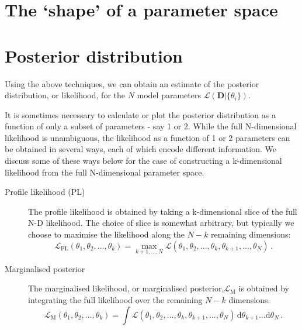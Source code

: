 
\section{The `shape' of a parameter space}



\section{Posterior distribution}

Using the above techniques, we can obtain an estimate of the posterior distribution, or likelihood, for the \(N\) model parameters \(\mathcal{L}(\textbf{D}|\{\theta_i\})\).

It is sometimes necessary to calculate or plot the posterior distribution as a function of only a subset of parameters - say 1 or 2. While the full N-dimensional likelihood is unambiguous, the likelihood as a function of 1 or 2 parameters can be obtained in several ways, each of which encode different information. We discuss some of these ways below for the case of constructing a k-dimensional likelihood from the full N-dimensional parameter space.

\begin{description}
\item[Profile likelihood (PL)] The profile likelihood is obtained by taking a k-dimensional slice of the full N-D likelihood. The choice of slice is somewhat arbitrary, but typically we choose to maximise the likelihood along the \(N-k\) remaining dimensions:
\begin{equation}
\mathcal{L}_{\textrm{PL}}(\theta_1,\theta_2,...,\theta_k) = \max_{k+1,...,N} \mathcal{L}(\theta_1,\theta_2,...,\theta_k,\theta_{k+1},...,\theta_N)\,.
\end{equation}
\item[Marginalised posterior] The marginalised likelihood, or marginalised posterior,\(\mathcal{L}_{\textrm{M}}\) is obtained by integrating the full likelihood over the remaining \(N-k\) dimensions.
\begin{equation}
\mathcal{L}_\textrm{M}(\theta_1,\theta_2,...,\theta_k) = \int \mathcal{L}(\theta_1,\theta_2,...,\theta_k,\theta_{k+1},...,\theta_N) \, \textrm{d}\theta_{k+1} ... \textrm{d}\theta_N \,.
\end{equation}
\end{description}

